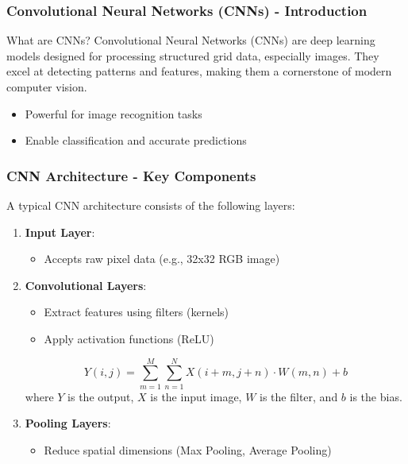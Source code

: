 \documentclass{beamer}
\begin{document}
\begin{frame}[fragile]
    \frametitle{Convolutional Neural Networks (CNNs) - Introduction}
    \begin{block}{What are CNNs?}
        Convolutional Neural Networks (CNNs) are deep learning models designed for processing structured grid data, especially images. 
        They excel at detecting patterns and features, making them a cornerstone of modern computer vision.
    \end{block}
    
    \begin{itemize}
        \item Powerful for image recognition tasks
        \item Enable classification and accurate predictions
    \end{itemize}
\end{frame}

\begin{frame}[fragile]
    \frametitle{CNN Architecture - Key Components}
    A typical CNN architecture consists of the following layers:
    
    \begin{enumerate}
        \item \textbf{Input Layer}:
            \begin{itemize}
                \item Accepts raw pixel data (e.g., 32x32 RGB image)
            \end{itemize}
        
        \item \textbf{Convolutional Layers}:
            \begin{itemize}
                \item Extract features using filters (kernels)
                \item Apply activation functions (ReLU)
            \end{itemize}
            \begin{equation}
            Y(i, j) = \sum_{m=1}^{M} \sum_{n=1}^{N} X(i+m, j+n) \cdot W(m, n) + b
            \end{equation}
            where $Y$ is the output, $X$ is the input image, $W$ is the filter, and $b$ is the bias.
            
        \item \textbf{Pooling Layers}:
            \begin{itemize}
                \item Reduce spatial dimensions (Max Pooling, Average Pooling)
            \end{itemize}
    \end{enumerate}
\end{frame}
\end{document}
